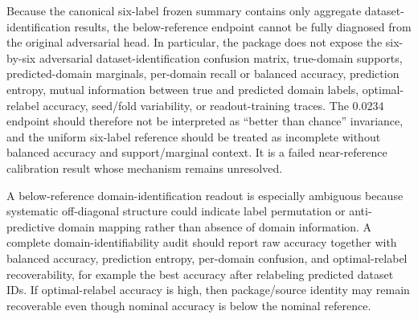 \documentclass[journal]{IEEEtran}
\begin{document}
Because the canonical six-label frozen summary contains only aggregate dataset-identification results, the below-reference endpoint cannot be fully diagnosed from the original adversarial head. In particular, the package does not expose the six-by-six adversarial dataset-identification confusion matrix, true-domain supports, predicted-domain marginals, per-domain recall or balanced accuracy, prediction entropy, mutual information between true and predicted domain labels, optimal-relabel accuracy, seed/fold variability, or readout-training traces. The 0.0234 endpoint should therefore not be interpreted as ``better than chance'' invariance, and the uniform six-label reference should be treated as incomplete without balanced accuracy and support/marginal context. It is a failed near-reference calibration result whose mechanism remains unresolved.

A below-reference domain-identification readout is especially ambiguous because systematic off-diagonal structure could indicate label permutation or anti-predictive domain mapping rather than absence of domain information. A complete domain-identifiability audit should report raw accuracy together with balanced accuracy, prediction entropy, per-domain confusion, and optimal-relabel recoverability, for example the best accuracy after relabeling predicted dataset IDs. If optimal-relabel accuracy is high, then package/source identity may remain recoverable even though nominal accuracy is below the nominal reference.
\end{document}
